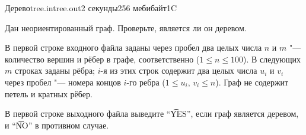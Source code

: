
\begin{problem}{Дерево}{tree.in}{tree.out}{2 секунды}{256 мебибайт}{1C}

Дан неориентированный граф. Проверьте, является ли он деревом.

\InputFile

В первой строке входного файла заданы через пробел два целых числа
$n$ и $m$ "--- количество вершин и рёбер в графе, соответственно
($1 \le n \le 100$). В следующих $m$ строках заданы рёбра; $i$-я из этих
строк содержит два целых числа $u_i$ и $v_i$ через пробел "--- номера концов
$i$-го ребра ($1 \le u_i, \, v_i \le n$).
Граф не содержит петель и кратных рёбер.

\OutputFile

В первой строке выходного файла выведите ``\t{YES}'', если граф является
деревом, и ``\t{NO}'' в противном случае.

\Examples

\begin{example}
%
%
\end{example}

\end{problem}
